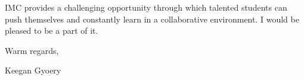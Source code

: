 \documentclass[a4paper,11pt]{article}
\begin{document}
IMC provides a challenging opportunity through which talented students can push themselves
and constantly learn in a collaborative environment. I would be pleased to be a part of it. \par

Warm regards, \par

Keegan Gyoery
\end{document}
